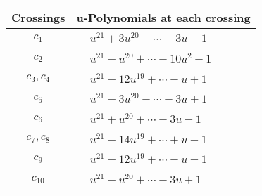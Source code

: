 \documentclass[1p]{elsarticle_modified}
\theoremstyle{definition}
\begin{document}
\begin{tabular}{m{50pt}|m{274pt}}
Crossings & \hspace{64pt}u-Polynomials at each crossing \\
\hline $$\begin{aligned}c_{1}\end{aligned}$$&$\begin{aligned}
&u^{21}+3 u^{20}+\cdots-3 u-1
\end{aligned}$\\
\hline $$\begin{aligned}c_{2}\end{aligned}$$&$\begin{aligned}
&u^{21}- u^{20}+\cdots+10 u^2-1
\end{aligned}$\\
\hline $$\begin{aligned}c_{3},c_{4}\end{aligned}$$&$\begin{aligned}
&u^{21}-12 u^{19}+\cdots- u+1
\end{aligned}$\\
\hline $$\begin{aligned}c_{5}\end{aligned}$$&$\begin{aligned}
&u^{21}-3 u^{20}+\cdots-3 u+1
\end{aligned}$\\
\hline $$\begin{aligned}c_{6}\end{aligned}$$&$\begin{aligned}
&u^{21}+u^{20}+\cdots+3 u-1
\end{aligned}$\\
\hline $$\begin{aligned}c_{7},c_{8}\end{aligned}$$&$\begin{aligned}
&u^{21}-14 u^{19}+\cdots+u-1
\end{aligned}$\\
\hline $$\begin{aligned}c_{9}\end{aligned}$$&$\begin{aligned}
&u^{21}-12 u^{19}+\cdots- u-1
\end{aligned}$\\
\hline $$\begin{aligned}c_{10}\end{aligned}$$&$\begin{aligned}
&u^{21}- u^{20}+\cdots+3 u+1
\end{aligned}$\\

\end{tabular}
\end{document}
